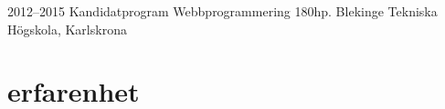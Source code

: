 \documentclass[]{friggeri-cv} %
\begin{document}
\begin{entrylist}
\entry
{2012--2015}
{Kandidatprogram Webbprogrammering 180hp.}
{Blekinge Tekniska Högskola, Karlskrona}
{}
\end{entrylist}


\section{erfarenhet}
\end{document}
